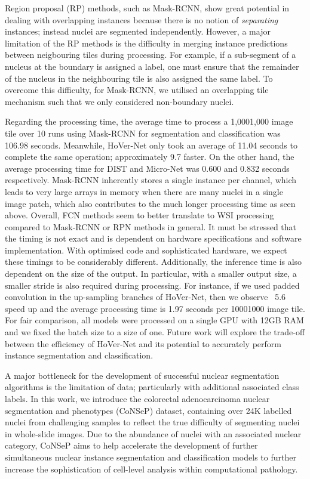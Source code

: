\documentclass[journal]{IEEEtran}
\begin{document}
	Region proposal (RP) methods, such as Mask-RCNN, show great potential in dealing with overlapping instances because there is no notion of \textit{separating} instances; instead nuclei are segmented independently. However, a major limitation of the RP methods is the difficulty in merging instance predictions between neigbouring tiles during processing. For example, if a sub-segment of a nucleus at the boundary is assigned a label, one must ensure that the remainder of the nucleus in the neighbouring tile is also assigned the same label. To overcome this difficulty, for Mask-RCNN, we utilised an overlapping tile mechanism such that we only considered non-boundary nuclei. 
	
	Regarding the processing time, the average time to process a 1,0001,000 image tile over 10 runs using Mask-RCNN for segmentation and classification was 106.98 seconds. Meanwhile, HoVer-Net only took an average of 11.04 seconds to complete the same operation; approximately 9.7 faster. On the other hand, the average processing time for DIST and Micro-Net was 0.600 and 0.832 seconds respectively. Mask-RCNN inherently stores a single instance per channel, which leads to very large arrays in memory when there are many nuclei in a single image patch, which also contributes to the much longer processing time as seen above. Overall, FCN methods seem to better translate to WSI processing compared to Mask-RCNN or RPN methods in general. It must be stressed that the timing is not exact and is dependent on hardware specifications and software implementation. With optimised code and sophisticated hardware, we expect these timings to be considerably different. Additionally, the inference time is also dependent on the size of the output. In particular, with a smaller output size, a smaller stride is also required during processing. For instance, if we used padded convolution in the up-sampling branches of HoVer-Net, then we observe ~5.6 speed up and the average processing time is 1.97 seconds per 10001000 image tile. For fair comparison, all models were processed on a single GPU with 12GB RAM and we fixed the batch size to a size of one. Future work will explore the trade-off between the efficiency of HoVer-Net and its potential to accurately perform instance segmentation and classification. 
	
	A major bottleneck for the development of successful nuclear segmentation algorithms is the limitation of data; particularly with additional associated class labels. In this work, we introduce the colorectal adenocarcinoma nuclear segmentation and phenotypes (CoNSeP) dataset, containing over 24K labelled nuclei from challenging samples to reflect the true difficulty of segmenting nuclei in whole-slide images. Due to the abundance of nuclei with an associated nuclear category, CoNSeP aims to help accelerate the development of further simultaneous nuclear instance segmentation and classification models to further increase the sophistication of cell-level analysis within computational pathology. 
	
\end{document}

